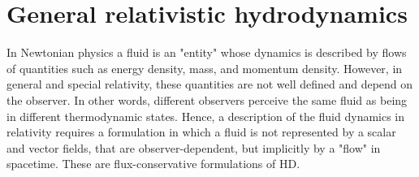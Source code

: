 %
%
%
%
%
%
%



\section{General relativistic hydrodynamics}\label{sec:theory:grhd}


In Newtonian physics a fluid is an "entity" whose dynamics is described by flows of 
quantities such as energy density, mass, and momentum density. However, in general and 
special relativity, these quantities are not well defined and depend on the observer. 
In other words, different observers perceive the same fluid as being in different thermodynamic 
states. Hence, a description of the fluid dynamics in relativity requires 
a formulation in which a fluid is not represented by a scalar and vector fields, 
that are observer-dependent, but implicitly by a "flow" in spacetime. 
These are flux-conservative formulations of \ac{HD}.

